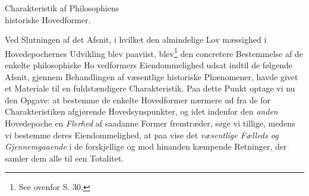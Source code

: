 \setcounter{footnote}{0}
%
\begin{center}
{\Large Charakteristik af Philosophiens\\
historiske Hovedformer.}
\end{center}
\divrule

Ved Slutningen af det Afsnit, i hvilket den almindelige Lov\-%
mæssighed i Hovedepochernes Udvikling blev paaviist, blev\footnote{See
ovenfor S. 30.}
den concretere Bestemmelse af de enkelte philosophiske Ho\-%
vedformers Eiendommelighed udsat indtil de følgende Afsnit,
gjennem Behandlingen af væsentlige historiske Phænomener,
havde givet et Materiale til en fuldstændigere Charakteristik.
Paa dette Punkt optage vi nu den Opgave: at bestemme de
enkelte Hovedformer nærmere ud fra de for Charakteristiken
afgjørende Hovedsynspunkter, og idet indenfor den \emph{anden}
Hovedepoche en \emph{Flerhed} af saadanne Former fremtræder, søge
vi tillige, medens vi bestemme deres Eiendommelighed, at paa\-%
vise det \emph{væsentlige Fælleds og Gjennemgaaende} i de
forskjellige og mod hinanden kæmpende Retninger, der samler
dem alle til een Totalitet.


